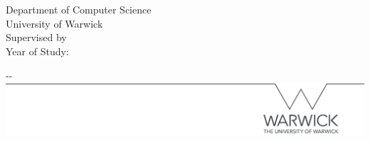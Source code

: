 \makeatletter
\begin{titlepage}


    \textbf{\Huge \@title} \\[1.5cm]
    \Large \textbf{\@author} \\
    Department of Computer Science \\
    University of Warwick \\

    Supervised by \@supervisor \\
    Year of Study: \@yearofstudy \\

    \vfill

    \begin{adjustwidth}{-\oddsidemargin-1in}{-\rightmargin}
        \centering
        \includegraphics[width=\paperwidth]{final-dissertation/titlepage/line.png}
    \end{adjustwidth}

    \vspace*{-3.5cm}

\end{titlepage}
\makeatother
